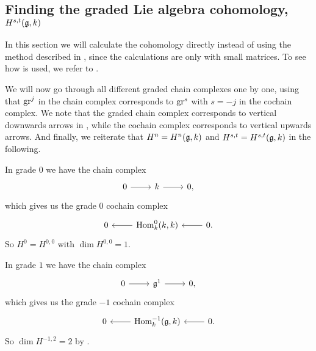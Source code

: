\subsection{Finding the graded Lie algebra cohomology, \texorpdfstring{$H^{s,t}(\mathfrak{g},k)$}{H(s,t)(g,k)}}%
\label{subsec:graded-coh-SL2}

\begin{remark}
  In this section we will calculate the cohomology directly instead of using the method described in , since the calculations are only with small matrices. To see how  is used, we refer to .
\end{remark}

We will now go through all different graded chain complexes one by one, using that $\operatorname{gr}^{j}$ in the chain complex corresponds to $\operatorname{gr}^{s}$ with $s = -j$ in the cochain complex. We note that the graded chain complex corresponds to vertical downwards arrows in , while the cochain complex corresponds to vertical upwards arrows. And finally, we reiterate that $H^{n} = H^{n}(\mathfrak{g},k)$ and $H^{s,t} = H^{s,t}(\mathfrak{g},k)$ in the following.

In grade $0$ we have the chain complex
\[
  \begin{tikzcd}
    0 \ar[r] & k \ar[r] & 0,
  \end{tikzcd}
\]
which gives us the grade $0$ cochain complex
\[
  \begin{tikzcd}
    0 & \ar[l] \Hom_{k}^{0}(k,k) & \ar[l] 0.
  \end{tikzcd}
\]
So $H^{0} = H^{0,0}$ with $\dim H^{0,0} = 1$.

In grade $1$ we have the chain complex
\[
  \begin{tikzcd}
    0 \ar[r] & \lie{g}^{1} \ar[r] & 0,
  \end{tikzcd}
\]
which gives us the grade $-1$ cochain complex
\[
  \begin{tikzcd}
    0 & \ar[l] \Hom_{k}^{-1}(\lie{g},k) & \ar[l] 0.
  \end{tikzcd}
\]
So $\dim H^{-1,2} = 2$ by .

